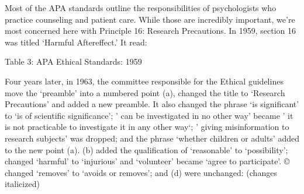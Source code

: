 Most of the APA standards outline the responsibilities of psychologists who practice counseling and patient care. While those are incredibly important, we're most concerned here with Principle 16: Research Precautions. In 1959, section 16 was titled `Harmful Aftereffect.' It read:

\noindent{} 

Table 3: APA Ethical Standards: 1959

Four years later, in 1963, the committee responsible for the Ethical guidelines move the `preamble' into a numbered point (a), changed the title to `Research Precautions' and added a new preamble. It also changed the phrase `is significant' to `is of scientific significance'; ' can be investigated in no other way' became ' it is not practicable to investigate it in any other way`; ' giving misinformation to research subjects' was dropped; and the phrase `whether children or adults' added to the new point (a). (b) added the qualification of `reasonable' to `possibility'; changed `harmful' to `injurious' and `volunteer' became `agree to participate'. © changed `removes' to `avoids or removes'; and (d) were unchanged: (changes italicized)

